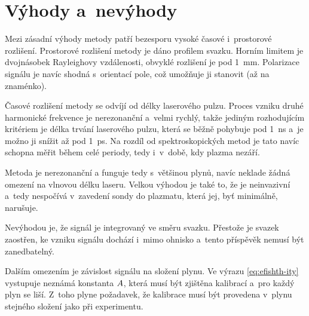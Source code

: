 \section{Výhody a~nevýhody}
\label{sec:efishth-proscons}
Mezi zásadní výhody metody \EFISH{} patří bezesporu vysoké časové
i~prostorové rozlišení.
Prostorové rozlišení metody je dáno profilem svazku.
Horním limitem je dvojnásobek Rayleighovy vzdálenosti,
obvyklé rozlišení je pod \SI{1}{\milli\metre}.
Polarizace signálu je navíc shodná s~orientací pole,
což umožňuje ji stanovit (až na znaménko).

Časové rozlišení metody se odvíjí od délky laserového pulzu.
Proces vzniku druhé harmonické frekvence je nerezonanční a~velmi rychlý,
takže jediným rozhodujícím kritériem je délka trvání laserového pulzu,
která se běžně pohybuje pod \SI{1}{\nano\second} a~je možno ji snížit
až pod \SI{1}{\pico\second}.
\autocite{efish-lecture}
Na rozdíl od spektroskopických metod je tato navíc schopna měřit
během celé periody, tedy i~v~době, kdy plazma nezáří.

Metoda je nerezonanční a funguje tedy s~většinou plynů,
navíc neklade žádná omezení na vlnovou délku laseru.
Velkou výhodou je také to, že je neinvazivní a~tedy nespočívá
v~zavedení sondy do plazmatu, která jej, byť minimálně, narušuje.

Nevýhodou \EFISH{} je, že signál je integrovaný ve směru svazku.
Přestože je svazek zaostřen, ke vzniku signálu dochází i~mimo ohnisko
a~tento příspěvěk nemusí být zanedbatelný.
\autocite{efish-lecture}

Dalším omezením je závislost signálu na složení plynu.
Ve výrazu \eqref{eq:efishth-ity} vystupuje neznámá konstanta $A$,
která musí být zjištěna kalibrací a~pro každý plyn se liší.
Z~toho plyne požadavek, že kalibrace musí být provedena v~plynu
stejného složení jako při experimentu.
